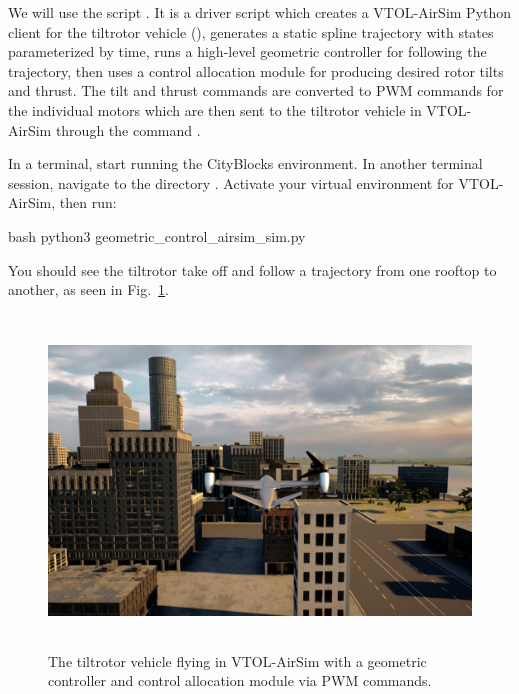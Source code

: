 We will use the script . It is a driver script which creates a VTOL-AirSim Python client for the tiltrotor vehicle (), generates a static spline trajectory with states parameterized by time, runs a high-level geometric controller for following the trajectory, then uses a control allocation module for producing desired rotor tilts and thrust. The tilt and thrust commands are converted to PWM commands for the individual motors which are then sent to the tiltrotor vehicle in VTOL-AirSim through the command .

In a terminal, start running the CityBlocks environment. In another terminal session, navigate to the directory . Activate your virtual environment for VTOL-AirSim, then run:
\begin{minttcb}[title={Python Script for Geometric Controller With PWM Commands}]{bash}
python3 geometric_control_airsim_sim.py
\end{minttcb}

You should see the tiltrotor take off and follow a trajectory from one rooftop to another, as seen in Fig.~\ref{fig:vtol_example_geometric}.
\begin{figure}[t]
    \centering
    \includegraphics[height=250pt]{figures/vtol_example_geometric}
    \caption[Tiltrotor flying with geometric controller and PWM commands]{
        The tiltrotor vehicle flying in VTOL-AirSim with a geometric controller and control allocation module via PWM commands.}%
    \label{fig:vtol_example_geometric}
\end{figure}

